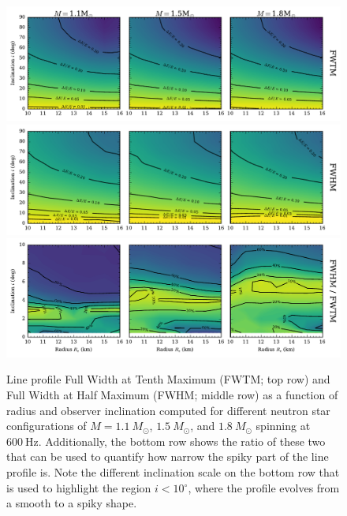 \documentclass{aa}
\newcommand{\Msun}{\ensuremath{M_{\odot}}}
\renewcommand{\deg}{\ensuremath{^{\circ}}}
\begin{document}
\begin{figure}[htbp!]
\centering
    \includegraphics[width=18cm]{figs/fwhm_full.pdf}
    \includegraphics[width=18cm]{figs/fwhm_abs.pdf}
    \includegraphics[width=18cm]{figs/fwhm_rel.pdf}
\caption{\label{fig:fwhm}
Line profile Full Width at Tenth Maximum (FWTM; top row) and Full Width at Half Maximum (FWHM; middle row) as a function of radius and observer inclination computed for different neutron star configurations of $M=1.1~\Msun$, $1.5~\Msun$, and $1.8~\Msun$ spinning at $600~\mathrm{Hz}$.
    Additionally, the bottom row shows the ratio of these two that can be used to quantify how narrow the spiky part of the line profile is.
    Note the different inclination scale on the bottom row that is used to highlight the region $i < 10\deg$, where the profile evolves from a smooth to a spiky shape.
}
\end{figure}
\end{document}
